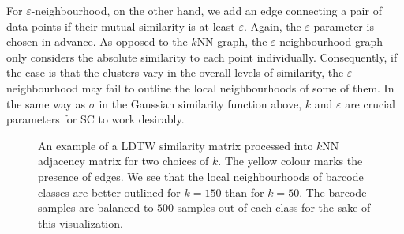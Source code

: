 For $\varepsilon$-neighbourhood, on the other hand, we add an edge connecting a pair of data points if their mutual similarity is at least $\varepsilon$. Again, the $\varepsilon$ parameter is chosen in advance. As opposed to the $k$NN graph, the $\varepsilon$-neighbourhood graph only considers the absolute similarity to each point individually. Consequently, if the case is that the clusters vary in the overall levels of similarity, the $\varepsilon$-neighbourhood may fail to outline the local neighbourhoods of some of them. In the same way as $\sigma$ in the Gaussian similarity function above, $k$ and $\varepsilon$ are crucial parameters for SC to work desirably.

\begin{figure}%
    \centering
    \qquad
    \caption[Adjacency matrices of $k$NN graphs]{An example of a LDTW similarity matrix processed into $k$NN adjacency matrix for two choices of $k$. The yellow colour marks the presence of edges. We see that the local neighbourhoods of barcode classes are better outlined for $k=150$ than for $k=50$. The barcode samples are balanced to $500$ samples out of each class for the sake of this visualization.}%
    \label{fig:knn_graphs}%
\end{figure}


